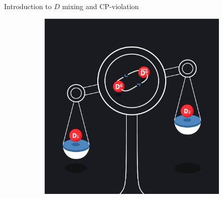 \documentclass{beamer}
\begin{document}
\begin{frame}{Introduction to $D$ mixing and CP-violation}
\begin{figure}
\begin{subfigure}{0.35\textwidth}
    \end{subfigure}
    \hspace{1.5cm}
    \begin{subfigure}{0.33\textwidth}
      \centering
      \includegraphics[width=1.0\textwidth]{Plots/D0OscArt.png}
    \end{subfigure}
  \end{figure}
\end{frame}
\end{document}
